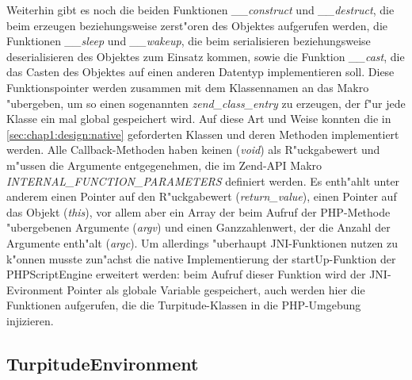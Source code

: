 Weiterhin gibt es noch die beiden Funktionen
\emph{\_\_construct} und \emph{\_\_destruct}, die beim erzeugen beziehungsweise zerst"oren des Objektes aufgerufen werden,
die Funktionen \emph{\_\_sleep} und \emph{\_\_wakeup}, die beim serialisieren beziehungsweise deserialisieren des Objektes zum
Einsatz kommen, sowie die Funktion \emph{\_\_cast}, die das Casten des Objektes auf einen anderen Datentyp implementieren soll.
Diese Funktionspointer werden zusammen mit dem Klassennamen an das Makro "ubergeben, um so einen sogenannten \emph{zend\_class\_entry}
zu erzeugen, der f"ur jede Klasse ein mal global gespeichert wird.
Auf diese Art und Weise konnten die in 
\ref{sec:chap1:design:native} geforderten Klassen und deren Methoden implementiert werden. Alle Callback-Methoden haben keinen (\emph{void})
als R"uckgabewert und m"ussen die Argumente entgegenehmen, die im Zend-API Makro \emph{INTERNAL\_FUNCTION\_PARAMETERS} definiert werden.
Es enth"ahlt unter anderem einen Pointer auf den R"uckgabewert (\emph{return\_value}), einen Pointer auf das Objekt (\emph{this}), vor
allem aber ein Array der beim Aufruf der PHP-Methode "ubergebenen Argumente (\emph{argv}) und einen Ganzzahlenwert, der die Anzahl
der Argumente enth"alt (\emph{argc}).
Um allerdings "uberhaupt JNI-Funktionen nutzen zu k"onnen musste zun"achst die native Implementierung der startUp-Funktion der PHPScriptEngine 
erweitert werden: beim Aufruf dieser Funktion
wird der JNI-Evironment Pointer als globale Variable gespeichert, auch werden hier die Funktionen aufgerufen, die die Turpitude-Klassen
in die PHP-Umgebung injizieren.

\subsection{TurpitudeEnvironment}
\label{sec:chap1:impl:3}

